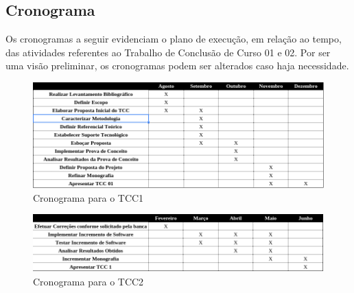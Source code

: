 \subsection{Cronograma}
 
	Os cronogramas a seguir evidenciam o plano de execução, em relação ao tempo, das atividades referentes ao Trabalho de Conclusão de Curso 01 e 02. Por ser uma visão preliminar, os cronogramas podem ser alterados caso haja necessidade. 
	  
  \begin{figure}[h]
    \centering
    \includegraphics[width=\textwidth]{figuras/cronograma1.png}
    \caption{Cronograma para o TCC1}
    \label{fig:cronograma1}
  \end{figure}
  
  \begin{figure}[h]
    \centering
    \includegraphics[width=\textwidth]{figuras/cronograma2.png}
    \caption{Cronograma para o TCC2}
    \label{fig:cronograma2}
  \end{figure}